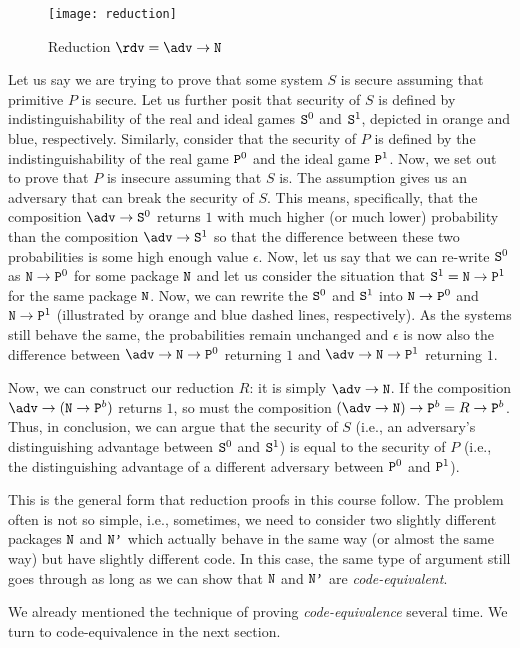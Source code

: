\begin{wrapfigure}{R}{0.6\textwidth}
\vspace{-0.5cm}
\begin{center}
\texttt{[image: reduction]}
\caption{\label{fig:reduction-example}Reduction $\rdv=\adv\circ\M{N}$}
\end{center}
\vspace{-0.5cm}
\end{wrapfigure}

Let us say we are trying to prove that some system $S$ is secure assuming that primitive $P$ is secure. Let us further posit that security of  $S$ is defined by indistinguishability of the real and ideal games $\text{\texttt{S}}^0$ and $\text{\texttt{S}}^1$, depicted in orange and blue, respectively. Similarly, consider that the security of $P$ is defined by the indistinguishability of the real game $\text{\texttt{P}}^0$ and the ideal game $\text{\texttt{P}}^1$. Now, we set out to prove that $P$ is insecure assuming that $S$ is. The assumption gives us an adversary that can break the security of $S$. This means, specifically, that the composition $\adv\circ\M{S}^0$ returns $1$ with much higher (or much lower) probability than the composition
$\adv\circ\M{S}^1$ so that the difference between these two probabilities is some high enough value $\epsilon$. Now, let us say that we can re-write $\text{\texttt{S}}^0$ as $\text{\texttt{N}}\rightarrow\text{\texttt{P}}^0$ for some package $\text{\texttt{N}}$ and let us consider the situation that $\text{\texttt{S}}^1=\text{\texttt{N}}\rightarrow\text{\texttt{P}}^1$ for the same package $\text{\texttt{N}}$. Now, we can rewrite the $\text{\texttt{S}}^0$ and $\text{\texttt{S}}^1$ into $\text{\texttt{N}}\rightarrow\text{\texttt{P}}^0$ and $\text{\texttt{N}}\rightarrow\text{\texttt{P}}^1$ (illustrated by orange and blue dashed lines, respectively). As the systems still behave the same, the probabilities remain unchanged and $\epsilon$ is now also the difference between $\adv \circ \M{N} \circ \M{P}^0$ returning $1$ and $\adv \circ \M{N} \circ \M{P}^1$ returning $1$.

Now, we can construct our reduction $R$: it is simply $\adv \circ \M{N}$. If the composition $\adv \circ (\M{N} \circ \M{P}^b)$ returns $1$, so must the composition $(\adv \circ \M{N}) \circ \M{P}^b = R \circ \M{P}^b$. Thus, in conclusion, we can argue that the security of $S$ (i.e., an adversary's distinguishing advantage between $\text{\texttt{S}}^0$ and $\text{\texttt{S}}^1$) is equal to the security of $P$ (i.e., the distinguishing advantage of a different adversary between $\text{\texttt{P}}^0$ and $\text{\texttt{P}}^1$). 

This is the general form that reduction proofs in this course follow. The problem often is not so simple, i.e., sometimes, we need to consider two slightly different packages $\text{\texttt{N}}$ and $\text{\texttt{N'}}$ which actually behave in the same way (or almost the same way) but have slightly different code. In this case, the same type of argument still goes through as long as we can show that $\text{\texttt{N}}$ and $\text{\texttt{N'}}$ are \emph{code-equivalent}. 
\fi

We already mentioned the technique of proving \emph{code-equivalence} several time. We turn to code-equivalence in the next section.